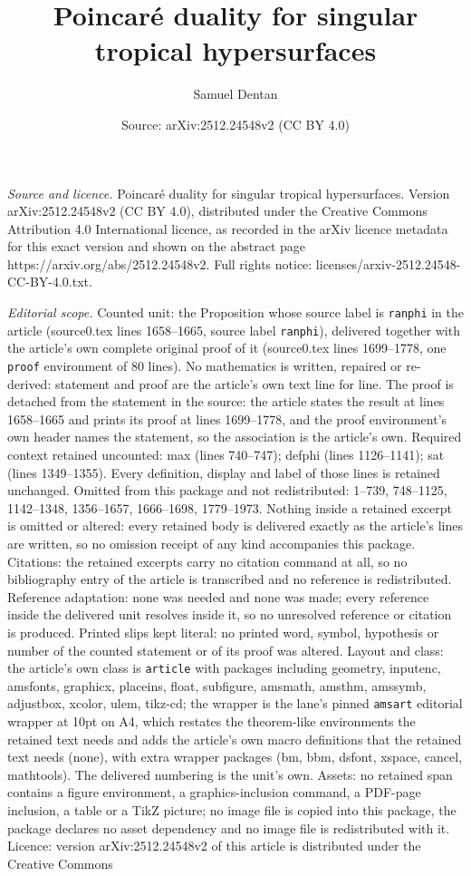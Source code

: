 \documentclass[10pt,a4paper]{amsart}
\title[Poincar\'e duality for singular tropical hypersurfaces]{Poincar\'e duality for singular tropical hypersurfaces}
\author{Samuel Dentan}
\date{Source: arXiv:2512.24548v2 (CC BY 4.0)}
\begin{document}
\maketitle

\noindent\emph{Source and licence.} Poincar\'e duality for singular tropical hypersurfaces. Version arXiv:2512.24548v2 (CC BY 4.0), distributed under the Creative Commons Attribution 4.0 International licence, as recorded in the arXiv licence metadata for this exact version and shown on the abstract page https://arxiv.org/abs/2512.24548v2. Full rights notice: licenses/arxiv-2512.24548-CC-BY-4.0.txt.\par\smallskip

\noindent\textit{Editorial scope.} Counted unit: the Proposition whose source label is \texttt{ranphi} in the article (source0.tex lines 1658--1665, source label \texttt{ranphi}), delivered together with the article's own complete original proof of it (source0.tex lines 1699--1778, one \texttt{proof} environment of 80 lines). No mathematics is written, repaired or re-derived: statement and proof are the article's own text line for line. The proof is detached from the statement in the source: the article states the result at lines 1658--1665 and prints its proof at lines 1699--1778, and the proof environment's own header names the statement, so the association is the article's own. Required context retained uncounted: max (lines 740--747); defphi (lines 1126--1141); sat (lines 1349--1355). Every definition, display and label of those lines is retained unchanged. Omitted from this package and not redistributed: 1--739, 748--1125, 1142--1348, 1356--1657, 1666--1698, 1779--1973. Nothing inside a retained excerpt is omitted or altered: every retained body is delivered exactly as the article's lines are written, so no omission receipt of any kind accompanies this package. Citations: the retained excerpts carry no citation command at all, so no bibliography entry of the article is transcribed and no reference is redistributed. Reference adaptation: none was needed and none was made; every reference inside the delivered unit resolves inside it, so no unresolved reference or citation is produced. Printed slips kept literal: no printed word, symbol, hypothesis or number of the counted statement or of its proof was altered. Layout and class: the article's own class is \texttt{article} with packages including geometry, inputenc, amsfonts, graphicx, placeins, float, subfigure, amsmath, amsthm, amssymb, adjustbox, xcolor, ulem, tikz-cd; the wrapper is the lane's pinned \texttt{amsart} editorial wrapper at 10pt on A4, which restates the theorem-like environments the retained text needs and adds the article's own macro definitions that the retained text needs (none), with extra wrapper packages (bm, bbm, dsfont, xspace, cancel, mathtools). The delivered numbering is the unit's own. Assets: no retained span contains a figure environment, a graphics-inclusion command, a PDF-page inclusion, a table or a TikZ picture; no image file is copied into this package, the package declares no asset dependency and no image file is redistributed with it. Licence: version arXiv:2512.24548v2 of this article is distributed under the Creative Commons 
\end{document}
